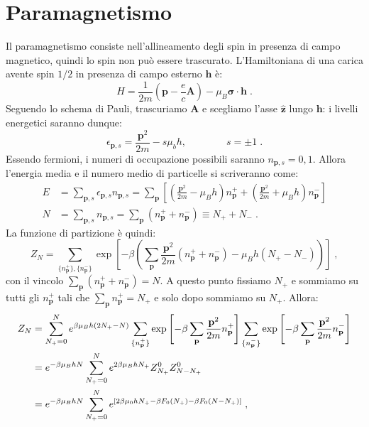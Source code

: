 \documentclass[10pt,a4paper]{report}
\theoremstyle{definition}
\numberwithin{equation}{section}
\begin{document}
\section{Paramagnetismo}
Il paramagnetismo consiste nell'allineamento degli spin in presenza di campo magnetico, quindi lo spin non può essere trascurato. L'Hamiltoniana di una carica avente spin $1/2$ in presenza di campo esterno $\mathbf{h}$ è:
\begin{equation}
H=\frac{1}{2m}\left(\mathbf{p}-\frac{e}{c}\mathbf{A}\right)-\mu_B\boldsymbol{\sigma}\cdot\mathbf{h}\;.
\end{equation}
Seguendo lo schema di Pauli, trascuriamo $\mathbf{A}$ e scegliamo l'asse $\hat{\mathbf{z}}$ lungo $\mathbf{h}$: i livelli energetici saranno dunque:
\begin{equation}
\epsilon_{\mathbf{p},s}=\frac{\mathbf{p}^2}{2m}-s\mu_bh,\qquad\qquad s=\pm 1\;.
\end{equation}
Essendo fermioni, i numeri di occupazione possibili saranno $n_{\mathbf{p},s}=0,1$. Allora l'energia media e il numero medio di particelle si scriveranno come:
\begin{align}
E&=\sum_{\mathbf{p},s}\epsilon_{\mathbf{p},s}n_{\mathbf{p},s}=\sum_{\mathbf{p}}\left[\left(\frac{\mathbf{p}^2}{2m}-\mu_Bh\right)n_{\mathbf{p}}^++\left(\frac{\mathbf{p}^2}{2m}+\mu_Bh\right)n_{\mathbf{p}}^-\right] \\
N&=\sum_{\mathbf{p},s}n_{\mathbf{p},s}=\sum_{\mathbf{p}}\left(n_{\mathbf{p}}^++n_{\mathbf{p}}^-\right)\equiv N_++N_-\;.
\end{align}
La funzione di partizione è quindi:
\begin{equation}
Z_N=\sum_{\{n_{\mathbf{p}}^+\},\{n_{\mathbf{p}}^-\}}\exp\left[-\beta\left(\sum_{\mathbf{p}}\frac{\mathbf{p}^2}{2m}(n_{\mathbf{p}}^++n_{\mathbf{p}}^-)-\mu_Bh(N_+-N_-)\right)\right]\;,
\end{equation}
con il vincolo $\sum_{\mathbf{p}}(n_{\mathbf{p}}^++n_{\mathbf{p}}^-)=N$. A questo punto fissiamo $N_+$ e sommiamo su tutti gli $n_{\mathbf{p}}^+$ tali che $\sum_{\mathbf{p}}n_{\mathbf{p}}^+=N_+$ e solo dopo sommiamo su $N_+$. Allora:
\begin{align}
Z_N &= \sum_{N_+=0}^N e^{\beta\mu_B h(2N_+-N)}\sum_{\{n_{\mathbf{p}}^+\}}\exp\left[-\beta\sum_{\mathbf{p}}\frac{\mathbf{p}^2}{2m}n_{\mathbf{p}}^+\right]\sum_{\{n_{\mathbf{p}}^-\}}\exp\left[-\beta\sum_{\mathbf{p}}\frac{\mathbf{p}^2}{2m}n_{\mathbf{p}}^-\right] \notag \\
&= e^{-\beta\mu_BhN}\sum_{N_+=0}^Ne^{2\beta\mu_BhN_+}Z_{N_+}^0Z_{N-N_+}^0 \notag \\
&= e^{-\beta\mu_BhN}\sum_{N_+=0}^Ne^{[2\beta\mu_0hN_+-\beta F_0(N_+)-\beta F_0(N-N_+)]}\;,
\end{align}
\end{document}
